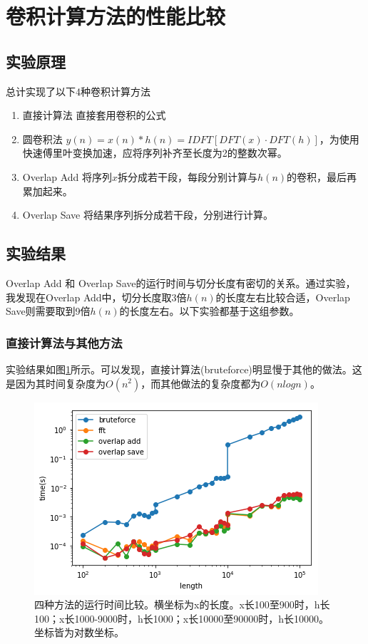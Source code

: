 \documentclass{article}
\begin{document}
\section{卷积计算方法的性能比较}
\subsection{实验原理}
总计实现了以下4种卷积计算方法
\begin{enumerate}
    \item 直接计算法 直接套用卷积的公式
    \item 圆卷积法 $y(n) = x(n) * h(n) = IDFT[DFT(x) \cdot DFT(h)]$，为使用快速傅里叶变换加速，应将序列补齐至长度为2的整数次幂。
    \item Overlap Add 将序列$x$拆分成若干段，每段分别计算与$h(n)$的卷积，最后再累加起来。
    \item Overlap Save
    将结果序列拆分成若干段，分别进行计算。
\end{enumerate}
\subsection{实验结果}
Overlap Add 和 Overlap Save的运行时间与切分长度有密切的关系。通过实验，我发现在Overlap Add中，切分长度取3倍$h(n)$的长度左右比较合适，Overlap Save则需要取到9倍$h(n)$的长度左右。以下实验都基于这组参数。
\subsubsection{直接计算法与其他方法}
实验结果如图\ref{fig:bf}所示。可以发现，直接计算法(bruteforce)明显慢于其他的做法。这是因为其时间复杂度为$O(n^2)$，而其他做法的复杂度都为$O(nlogn)$。
\begin{figure}[htbp]
    \centering
    \includegraphics[width = .7\textwidth]{problem2/time_all.png}
    \caption{四种方法的运行时间比较。横坐标为x的长度。x长100至900时，h长100；x长1000-9000时，h长1000；x长10000至90000时，h长10000。坐标皆为对数坐标。}
    \label{fig:bf}
\end{figure}
\end{document}
